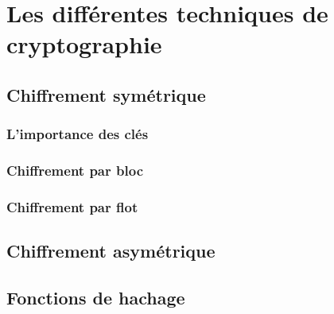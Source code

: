 \chapter{Les différentes techniques de cryptographie}





\section{Chiffrement symétrique}
\subsection{L'importance des clés}
\subsection{Chiffrement par bloc}
\subsection{Chiffrement par flot}

\section{Chiffrement asymétrique}

\section{Fonctions de hachage}

